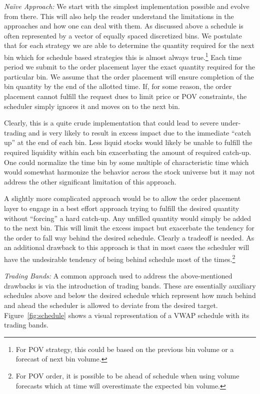 \noindent\emph{Na\"ive Approach:} We start with the simplest implementation possible and evolve from there. This will also help the reader understand the limitations in the approaches and how one can deal with them. As discussed above a schedule is often represented by a vector of equally spaced discretized bins. We postulate that for each strategy we are able to determine the quantity required for the next bin which for schedule based strategies this is almost always true.\footnote{For POV strategy, this could be based on the previous bin volume or a forecast of next bin volume.} Each time period we submit to the order placement layer the exact quantity required for the particular bin. We assume that the order placement will ensure completion of the bin quantity by the end of the allotted time. If, for some reason, the order placement cannot fulfill the request dues to limit price or POV constraints, the scheduler simply ignores it and moves on to the next bin. 


Clearly, this is a quite crude implementation that could lead to severe under-trading and is very likely to result in excess impact due to the immediate ``catch up'' at the end of each bin. Less liquid stocks would likely be unable to fulfill the required liquidity within each bin exacerbating the amount of required catch-up. One could normalize the time bin by some multiple of characteristic time which would somewhat harmonize the behavior across the stock universe but it may not address the other significant limitation of this approach.


A slightly more complicated approach would be to allow the order placement layer to engage in a best effort approach trying to fulfill the desired quantity without ``forcing'' a hard catch-up. Any unfilled quantity would simply be added to the next bin. This will limit the excess impact but exacerbate the tendency for the order to fall way behind the desired schedule. Clearly a tradeoff is needed. As an additional drawback to this approach is that in most cases the scheduler will have the undesirable tendency of being behind schedule most of the times.\footnote{For POV order, it is possible to be ahead of schedule when using volume forecasts which at time will overestimate the expected bin volume.} \twomedskip


\noindent\emph{Trading Bands:} A common approach used to address the above-mentioned drawbacks is via the introduction of trading bands. These are essentially auxiliary schedules above and below the desired schedule which represent how much behind and ahead the scheduler is allowed to deviate from the desired target. Figure~\ref{fig:schedule} shows a visual representation of a VWAP schedule with its trading bands. 



